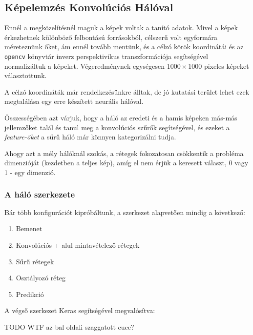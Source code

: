 \newpage
\subsection{Képelemzés Konvolúciós Hálóval}

Ennél a megközelítésnél maguk a képek voltak a tanító adatok.
Mivel a képek érkezhetnek különböző felbontású forrásokból, célszerű volt
egyformára méreteznünk őket, ám ennél tovább mentünk, és a célzó körök koordinátái 
és az \texttt{opencv} könyvtár inverz perspektivikus transzformációja segítségével 
normalizáltuk a képeket. Végeredménynek egységesen $ 1000 \times 1000 $ pixeles képeket
választottunk.

A célzó koordináták már rendelkezésünkre álltak, de jó kutatási terület lehet ezek 
megtalálása egy erre készített neurális hálóval.


Összességében azt várjuk, hogy a háló az eredeti és a hamis képeken más-más 
jellemzőket talál és tanul meg a konvolúciós szűrők segítségével, és ezeket
a \textit{feature-öket} a sűrű háló már könnyen kategorizálni tudja.

Ahogy azt a mély hálóknál szokás, a rétegek fokozatosan csökkentik a probléma
dimenzióját (kezdetben a teljes kép), amíg el nem érjük a keresett választ, 0 vagy 1 - 
egy dimenzió.

\subsubsection{A háló szerkezete}

Bár több konfigurációt kipróbáltunk, a szerkezet alapvetően mindig a következő:



\begin{enumerate} [itemsep=-1ex]
	\item Bemenet
	\item Konvolúciós + alul mintavételező rétegek
	\item Sűrű rétegek
	\item Osztályozó réteg
	\item Predikció
\end{enumerate}

A végső szerkezet Keras segítségével megvalósítva:

TODO WTF az bal oldali szaggatott cucc?

